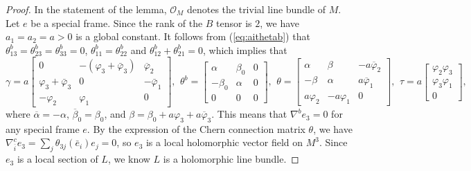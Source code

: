 \documentclass{amsart}
\numberwithin{equation}{section}
\theoremstyle{definition}
\renewcommand{\1}{\mathds{1}}
\renewcommand{\>}{\rightarrow}
\begin{document}
\begin{proof}
In the statement of the lemma,  ${\mathcal O}_{\!M}$ denotes the trivial line bundle of $M$. Let $e$ be a special frame. Since the rank of the $B$ tensor is $2$, we have $a_1=a_2=a>0$ is a global constant. It follows from (\ref{eq:aithetab}) that $\theta^b_{13}=\theta_{23}^b=\theta^b_{33}=0$,  $\theta^b_{11}=\theta^b_{22}$ and $\theta^b_{12}+\theta^b_{21}=0$, which implies that
\[\gamma = a\!\begin{bmatrix} 0 & -(\varphi_3+\bar{\varphi}_3) & \overline{\varphi}_2 \\
                                      \varphi_3 + \bar{\varphi}_3 & 0 & - \bar{\varphi}_1 \\
                                       -\varphi_2 & \varphi_1 & 0 \end{bmatrix}\!\!, \ \,
\theta^b =  \begin{bmatrix} \alpha & \beta_0  & 0 \\ -\beta_0 & \alpha &  0  \\ 0 & 0 & 0 \end{bmatrix}\!\!, \ \,
\theta =  \begin{bmatrix} \alpha & \beta  &  - a\overline{\varphi}_2 \\ -\beta & \alpha &  a\overline{\varphi}_1  \\ a\varphi_2 & -a\varphi_1 & 0 \end{bmatrix}\!\! ,  \ \,
\tau = a \!\begin{bmatrix} \varphi_2\varphi_3 \\ \varphi_3\varphi_1  \\ 0  \end{bmatrix}\!\!,\]
where $\overline{\alpha}=-\alpha$, $\overline{\beta}_0=\beta_0$, and $\beta = \beta_0 +a\varphi_3 + a\overline{\varphi}_3$. This means that $\nabla^be_3=0$ for any special frame $e$. By the expression of the Chern connection matrix $\theta$, we have $\nabla^c_{\overline{i}}e_3=\sum_j \theta_{3j}(\bar{e}_i)e_j =0$, so $e_3$ is a local holomorphic vector field on $M^3$. Since $e_3$ is  a local section of $L$,  we know $L$ is a holomorphic line bundle.


\end{proof}
\end{document}
